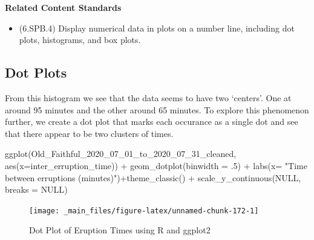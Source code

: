 \documentclass[
]{book}
\newenvironment{Shaded}{\begin{snugshade}}{\end{snugshade}}
\newcommand{\AttributeTok}[1]{\textcolor[rgb]{0.77,0.63,0.00}{#1}}
\newcommand{\ConstantTok}[1]{\textcolor[rgb]{0.00,0.00,0.00}{#1}}
\newcommand{\DecValTok}[1]{\textcolor[rgb]{0.00,0.00,0.81}{#1}}
\newcommand{\FunctionTok}[1]{\textcolor[rgb]{0.00,0.00,0.00}{#1}}
\newcommand{\NormalTok}[1]{#1}
\newcommand{\SpecialCharTok}[1]{\textcolor[rgb]{0.00,0.00,0.00}{#1}}
\newcommand{\StringTok}[1]{\textcolor[rgb]{0.31,0.60,0.02}{#1}}
\providecommand{\tightlist}{%
  \setlength{\itemsep}{0pt}\setlength{\parskip}{0pt}}
\newenvironment{standards}{}{}
\theoremstyle{definition}
\theoremstyle{definition}
\theoremstyle{definition}
\theoremstyle{definition}
\theoremstyle{remark}
\begin{document}
\begin{standards}

\begin{center}
\textbf{Related Content Standards}

\end{center}

\begin{itemize}
\tightlist
\item
  (6.SPB.4) Display numerical data in plots on a number line, including dot plots, histograms, and box plots.
\end{itemize}

\end{standards}

\hypertarget{dot-plots}{%
\subsection{Dot Plots}\label{dot-plots}}

From this histogram we see that the data seems to have two `centers'. One at around 95 minutes and the other around 65 minutes. To explore this phenomenon further, we create a dot plot that marks each occurance as a single dot and see that there appear to be two clusters of times.

\begin{Shaded}
\begin{Highlighting}[]
\FunctionTok{ggplot}\NormalTok{(Old\_Faithful\_2020\_07\_01\_to\_2020\_07\_31\_cleaned, }\FunctionTok{aes}\NormalTok{(}\AttributeTok{x=}\NormalTok{inter\_erruption\_time)) }\SpecialCharTok{+} \FunctionTok{geom\_dotplot}\NormalTok{(}\AttributeTok{binwidth =}\NormalTok{ .}\DecValTok{5}\NormalTok{) }\SpecialCharTok{+} \FunctionTok{labs}\NormalTok{(}\AttributeTok{x=} \StringTok{"Time between erruptions (minutes)"}\NormalTok{)}\SpecialCharTok{+}\FunctionTok{theme\_classic}\NormalTok{() }\SpecialCharTok{+} \FunctionTok{scale\_y\_continuous}\NormalTok{(}\ConstantTok{NULL}\NormalTok{, }\AttributeTok{breaks =} \ConstantTok{NULL}\NormalTok{)}
\end{Highlighting}
\end{Shaded}

\begin{figure}

{\centering \texttt{[image: \_main\_files/figure-latex/unnamed-chunk-172-1]} 

}

\caption{Dot Plot of Eruption Times using R and ggplot2}\label{fig:unnamed-chunk-172}
\end{figure}
\end{document}
